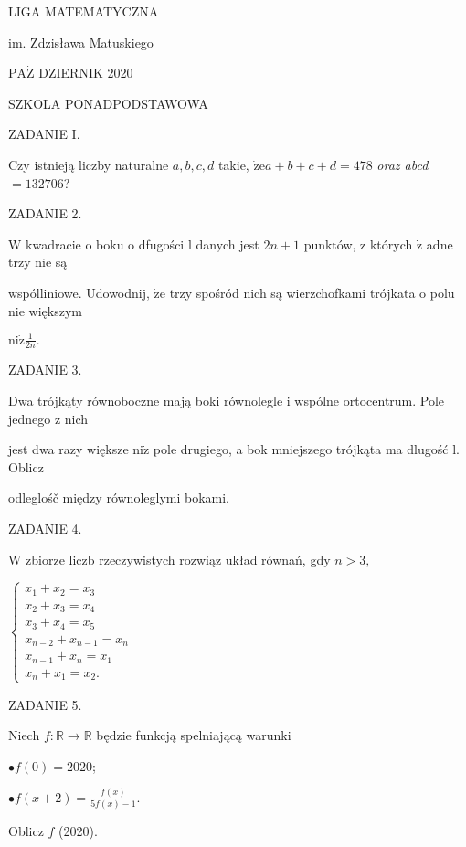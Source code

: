 \documentclass[a4paper,12pt]{article}
\begin{document}
LIGA MATEMATYCZNA

im. Zdzisława Matuskiego

$\mathrm{P}\mathrm{A}\dot{\mathrm{Z}}$ DZIERNIK 2020

SZKOLA PONADPODSTAWOWA

ZADANIE I.

Czy istnieją liczby naturalne $a, b, c, d$ takie, $\dot{\mathrm{z}}\mathrm{e}a+b+c+d=478$ {\it oraz abcd}$=132706$?

ZADANIE 2.

$\mathrm{W}$ kwadracie o boku o dfugości l danych jest $2n+1$ punktów, z których $\dot{\mathrm{z}}$ adne trzy nie są

wspólliniowe. Udowodnij, $\dot{\mathrm{z}}\mathrm{e}$ trzy spośród nich są wierzchofkami trójkata o polu nie większym

$\displaystyle \mathrm{n}\mathrm{i}\dot{\mathrm{z}}\frac{1}{2n}.$

ZADANIE 3.

Dwa trójkąty równoboczne mają boki równolegle i wspólne ortocentrum. Pole jednego z nich

jest dwa razy większe $\mathrm{n}\mathrm{i}\dot{\mathrm{z}}$ pole drugiego, a bok mniejszego trójkąta ma dlugość l. Oblicz

odleglośč między równoleglymi bokami.

ZADANIE 4.

$\mathrm{W}$ zbiorze liczb rzeczywistych rozwiąz układ równań, gdy $n>3,$

$\left\{\begin{array}{l}
x_{1}+x_{2}=x_{3}\\
x_{2}+x_{3}=x_{4}\\
x_{3}+x_{4}=x_{5}\\
x_{n-2}+x_{n-1}=x_{n}\\
x_{n-1}+x_{n}=x_{1}\\
x_{n}+x_{1}=x_{2}.
\end{array}\right.$

ZADANIE 5.

Niech $f:\mathbb{R}\rightarrow \mathbb{R}$ będzie funkcją spelniającą warunki

$\bullet f(0)=2020$;

$\bullet f(x+2)=\displaystyle \frac{f(x)}{5f(x)-1}.$

Oblicz $f$ (2020).
\end{document}
